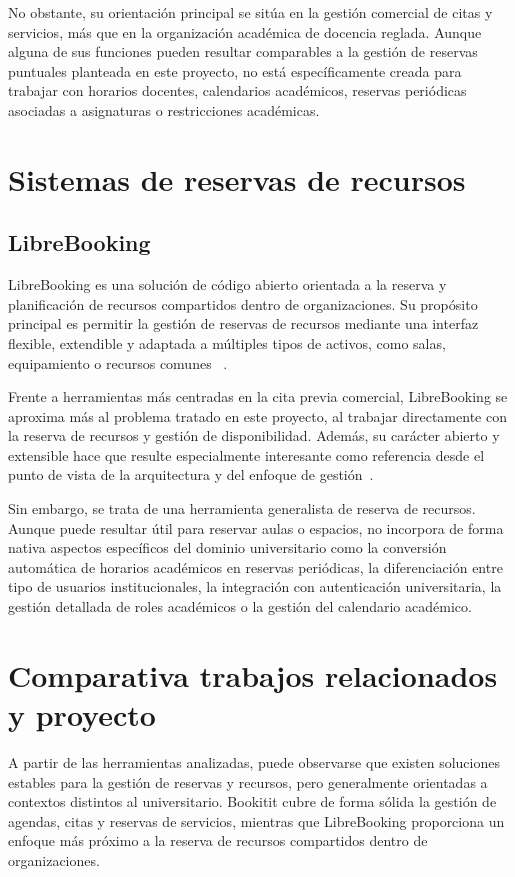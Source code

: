 No obstante, su orientación principal se sitúa en la gestión comercial de citas y servicios, más que en la organización académica de docencia reglada. Aunque alguna de sus funciones pueden resultar comparables a la gestión de reservas puntuales planteada en este proyecto, no está específicamente creada para trabajar con horarios docentes, calendarios académicos, reservas periódicas asociadas a asignaturas o restricciones académicas.

\section{Sistemas de reservas de recursos}
\subsection{LibreBooking}
LibreBooking es una solución de código abierto orientada a la reserva y planificación de recursos compartidos dentro de organizaciones. Su propósito principal es permitir la gestión de reservas de recursos mediante una interfaz flexible, extendible y adaptada a múltiples tipos de activos, como salas, equipamiento o recursos comunes ~\cite{librebooking:web,librebooking:github}.

Frente a herramientas más centradas en la cita previa comercial, LibreBooking se aproxima más al problema tratado en este proyecto, al trabajar directamente con la reserva de recursos y gestión de disponibilidad. Además, su carácter abierto y extensible hace que resulte especialmente interesante como referencia desde el punto de vista de la arquitectura y del enfoque de gestión~\cite{librebooking:web,librebooking:github}.

Sin embargo, se trata de una herramienta generalista de reserva de recursos. Aunque puede resultar útil para reservar aulas o espacios, no incorpora de forma nativa aspectos específicos del dominio universitario como la conversión automática de horarios académicos en reservas periódicas, la diferenciación entre tipo de usuarios institucionales, la integración con autenticación universitaria, la gestión detallada de roles académicos o la gestión del calendario académico.

\section{Comparativa trabajos relacionados y proyecto}

A partir de las herramientas analizadas, puede observarse que existen soluciones estables para la gestión de reservas y recursos, pero generalmente orientadas a contextos distintos al universitario. Bookitit cubre de forma sólida la gestión de agendas, citas y reservas de servicios, mientras que LibreBooking proporciona un enfoque más próximo a la reserva de recursos compartidos dentro de organizaciones.

